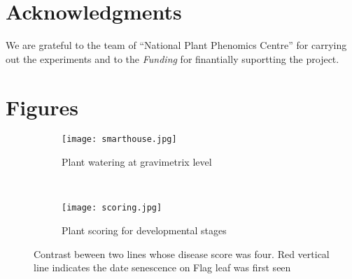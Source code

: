 \documentclass{frontiersSCNS} %
\begin{document}
\section*{Acknowledgments}
 We are grateful to the team of “National Plant Phenomics Centre” for carrying out the experiments and to the 
\textit{Funding\textcolon} for finantially suportting the project.






\section*{Figures}


\begin{figure}
    \begin{center}
    \begin{subfigure}[b]{0.5\textwidth}
        \texttt{[image: smarthouse.jpg]}
        \caption{Plant watering at gravimetrix level}
    \end{subfigure}
    ~ %
    \begin{subfigure}[b]{0.5\textwidth}
        \texttt{[image: scoring.jpg]}
        \caption{Plant scoring for developmental stages}
    \end{subfigure}
\end{center}
    \caption{Contrast beween two lines whose disease score was four. Red vertical line indicates the date senescence on Flag leaf was first seen}\label{fig3}
\end{figure}
\end{document}
